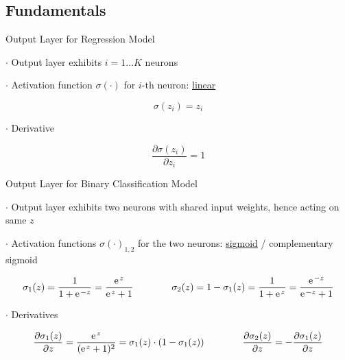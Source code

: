 \documentclass[mathserif, aspectratio=1610]{intbeamer}
\begin{document}
\subsection{Fundamentals}

\begin{frame}[t]{Output Layer for Regression Model}

$\cdot$ Output layer exhibits $i=1 \dots K$ neurons

$\cdot$ Activation function $\sigma(\cdot)$ for $i\text{-th}$ neuron: \underline{linear}

$$\sigma(z_i) = z_i$$

$\cdot$ Derivative

$$\frac{\partial \sigma(z_i)}{\partial z_i} = 1$$

\end{frame}



\begin{frame}[t]{Output Layer for Binary Classification Model}

$\cdot$ Output layer exhibits two neurons with shared input weights, hence acting on same $z$

$\cdot$ Activation functions $\sigma(\cdot)_{1,2}$ for the two neurons: \underline{sigmoid} / complementary sigmoid

$$\sigma_1(z) = \frac{1}{1+\e^{-z}} = \frac{\e^{z}}{\e^{z}+1} \qquad\qquad \sigma_2(z) = 1-\sigma_1(z) = \frac{1}{1 + \e^{z}} = \frac{\e^{-z}}{\e^{-z}+1}$$

\begin{center}
\end{center}

$\cdot$ Derivatives

$$\frac{\partial \sigma_1(z)}{\partial z} = \frac{\e^{z}}{(\e^{z}+1)^2} = \sigma_1(z) \cdot (1-\sigma_1(z)) \qquad\qquad \frac{\partial \sigma_2(z)}{\partial z} = - \frac{\partial \sigma_1(z)}{\partial z} $$

\end{frame}
\end{document}
